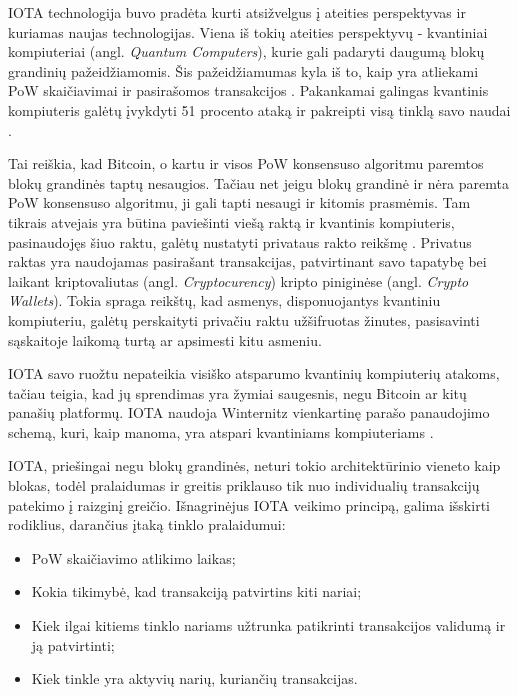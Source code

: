 IOTA technologija buvo pradėta kurti atsižvelgus į ateities perspektyvas ir kuriamas naujas technologijas. Viena iš tokių ateities perspektyvų - kvantiniai kompiuteriai (angl. \textit{Quantum Computers}), kurie gali padaryti daugumą blokų grandinių pažeidžiamomis. Šis pažeidžiamumas kyla iš to, kaip yra atliekami PoW skaičiavimai ir pasirašomos transakcijos \cite{kiktenko2018quantum}. Pakankamai galingas kvantinis kompiuteris galėtų įvykdyti 51 procento ataką ir pakreipti visą tinklą savo naudai \cite{kiktenko2018quantum}. 

Tai reiškia, kad Bitcoin, o kartu ir visos PoW konsensuso algoritmu paremtos blokų grandinės taptų nesaugios. Tačiau net jeigu blokų grandinė ir nėra paremta PoW konsensuso algoritmu, ji gali tapti nesaugi ir kitomis prasmėmis. Tam tikrais atvejais yra būtina paviešinti viešą raktą ir kvantinis kompiuteris, pasinaudojęs šiuo raktu, galėtų nustatyti privataus rakto reikšmę \cite{aggarwal2017quantum}. Privatus raktas yra naudojamas pasirašant transakcijas, patvirtinant savo tapatybę bei laikant kriptovaliutas (angl. \textit{Cryptocurency}) kripto piniginėse (angl. \textit{Crypto Wallets}). Tokia spraga reikštų, kad asmenys, disponuojantys kvantiniu kompiuteriu, galėtų perskaityti privačiu raktu užšifruotas žinutes, pasisavinti sąskaitoje laikomą turtą ar apsimesti kitu asmeniu.

IOTA savo ruožtu nepateikia visiško atsparumo kvantinių kompiuterių atakoms, tačiau teigia, kad jų sprendimas yra žymiai saugesnis, negu Bitcoin ar kitų panašių platformų. IOTA naudoja Winternitz vienkartinę parašo panaudojimo schemą, kuri, kaip manoma, yra atspari kvantiniams kompiuteriams \cite{el2018review}.





IOTA, priešingai negu blokų grandinės, neturi tokio architektūrinio vieneto kaip blokas, todėl pralaidumas ir greitis priklauso tik nuo individualių transakcijų patekimo į raizginį greičio. Išnagrinėjus IOTA veikimo principą, galima išskirti rodiklius, darančius įtaką tinklo pralaidumui:
\begin{itemize}
    \item PoW skaičiavimo atlikimo laikas;
    \item Kokia tikimybė, kad transakciją patvirtins kiti nariai;
    \item Kiek ilgai kitiems tinklo nariams užtrunka patikrinti transakcijos validumą ir ją patvirtinti;
    \item Kiek tinkle yra aktyvių narių, kuriančių transakcijas.
\end{itemize}

